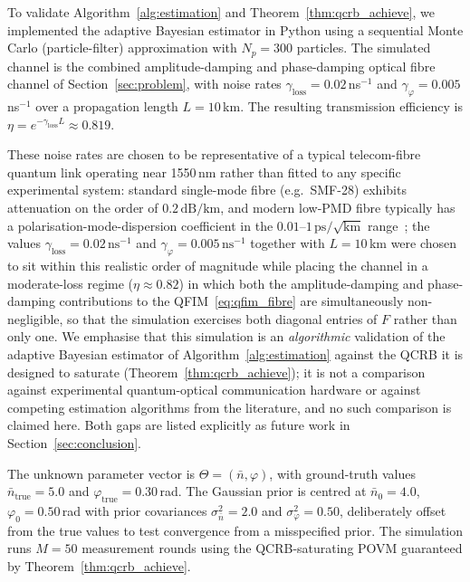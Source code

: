 \documentclass[journal,twocolumn]{IEEEtran}
\theoremstyle{definition}
\theoremstyle{plain}
\begin{document}
To validate Algorithm~\ref{alg:estimation} and
Theorem~\ref{thm:qcrb_achieve}, we implemented the adaptive
Bayesian estimator in Python using a sequential Monte Carlo
(particle-filter) approximation with $N_p = 300$ particles.
The simulated channel is the combined amplitude-damping and
phase-damping optical fibre channel of
Section~\ref{sec:problem}, with noise rates
$\gamma_{\mathrm{loss}} = 0.02$\,ns$^{-1}$ and
$\gamma_\varphi = 0.005$\,ns$^{-1}$ over a propagation
length $L = 10$\,km.  The resulting transmission efficiency
is $\eta = e^{-\gamma_{\mathrm{loss}}L} \approx 0.819$.

These noise rates are chosen to be representative of a typical
telecom-fibre quantum link operating near 1550\,nm rather than
fitted to any specific experimental system: standard single-mode
fibre (e.g.\ SMF-28) exhibits attenuation on the order of
$0.2\,\mathrm{dB/km}$, and modern low-PMD fibre typically has a
polarisation-mode-dispersion coefficient in the
$0.01$--$1\,\mathrm{ps}/\sqrt{\mathrm{km}}$ range~\cite{agrawal2007};
the values $\gamma_{\mathrm{loss}} = 0.02\,\mathrm{ns}^{-1}$ and
$\gamma_\varphi = 0.005\,\mathrm{ns}^{-1}$ together with $L=10$\,km
were chosen to sit within this realistic order of magnitude while
placing the channel in a moderate-loss regime ($\eta\approx 0.82$)
in which both the amplitude-damping and phase-damping contributions
to the QFIM~\eqref{eq:qfim_fibre} are simultaneously non-negligible,
so that the simulation exercises both diagonal entries of $F$ rather
than only one. We emphasise that this simulation is an
\emph{algorithmic} validation of the adaptive Bayesian estimator of
Algorithm~\ref{alg:estimation} against the QCRB it is designed to
saturate (Theorem~\ref{thm:qcrb_achieve}); it is not a comparison
against experimental quantum-optical communication hardware or
against competing estimation algorithms from the literature, and no
such comparison is claimed here. Both gaps are listed explicitly as
future work in Section~\ref{sec:conclusion}.

The unknown parameter vector is
$\Theta = (\bar n,\varphi)$, with ground-truth values
$\bar n_{\mathrm{true}} = 5.0$ and
$\varphi_{\mathrm{true}} = 0.30$\,rad.  The Gaussian prior
is centred at $\bar n_0 = 4.0$, $\varphi_0 = 0.50$\,rad
with prior covariances $\sigma_{\bar n}^2 = 2.0$ and
$\sigma_\varphi^2 = 0.50$, deliberately offset from the
true values to test convergence from a misspecified prior.
The simulation runs $M = 50$ measurement rounds using the
QCRB-saturating POVM guaranteed by
Theorem~\ref{thm:qcrb_achieve}.
\end{document}
